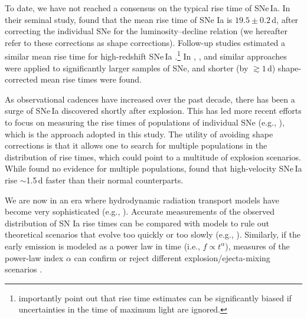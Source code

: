\documentclass[twocolumn]{./aastex63}
\begin{document}
To date, we have not reached a consensus on the typical rise time of SNe\,Ia.
In their seminal study, \citet{Riess99a} found that the mean rise time of SNe
Ia is $19.5 \pm 0.2$\,d, after correcting the individual SNe for the
luminosity--decline relation (we hereafter refer to these corrections as shape
corrections). Follow-up studies estimated a similar mean rise time for
high-redshift SNe\,Ia \citep{Aldering00,Conley06}.\footnote{\citet{Aldering00}
importantly point out that rise time estimates can be significantly biased if
uncertainties in the time of maximum light are ignored.} In \citet{Hayden10},
\citet{Ganeshalingam11}, and \citet{Gonzalez-Gaitan12} similar approaches were
applied to significantly larger samples of SNe, and shorter (by $\gtrsim
1$\,d) shape-corrected mean rise times were found.

As observational cadences have increased over the past decade, there has been
a surge of SNe\,Ia discovered shortly after explosion. This has led more
recent efforts to focus on measuring the rise times of populations of
individual SNe (e.g., \citealt{Firth15,Zheng17a,Papadogiannakis19}), which is
the approach adopted in this study. The utility of avoiding shape corrections
is that it allows one to search for multiple populations in the distribution
of rise times, which could point to a multitude of explosion scenarios. While
\citet{Papadogiannakis19} found no evidence for multiple populations,
\citet{Ganeshalingam11} found that high-velocity SNe\,Ia rise $\sim$1.5\,d
faster than their normal counterparts.

We are now in an era where hydrodynamic radiation transport models have become
very sophisticated (e.g.,
\citealt{Sim13,Dessart14,Kromer16,Noebauer17,Polin19,Townsley19,Gronow20,Magee20}). Accurate measurements of the observed distribution of SN Ia rise times
can be compared with models to rule out theoretical scenarios that evolve too
quickly or too slowly (e.g., \citealt{Magee18}). Similarly, if the early
emission is modeled as a power law in time (i.e., $f \propto t^\alpha$),
measures of the power-law index $\alpha$ can confirm or reject different
explosion/ejecta-mixing scenarios \citep{Magee20}.
\end{document}
